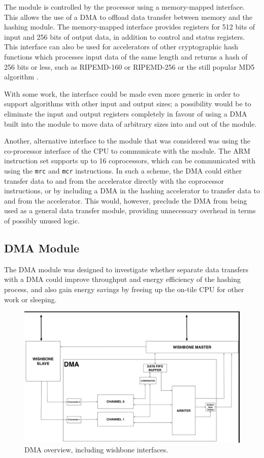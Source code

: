 The module is controlled by the processor using a memory-mapped interface. This allows the use
of a DMA to offload data transfer between memory and the hashing module. The memory-mapped interface
provides registers for 512 bits of input and 256 bits of output data, in addition to control and
status registers. This interface can also be used for accelerators of other cryptographic hash
functions which processes input data of the same length and returns a hash of 256 bits or less,
such as RIPEMD-160 or RIPEMD-256 \cite{ripemd} or the still popular MD5 algorithm \cite{md5}.

With some work, the interface could be made even more generic in order to support algorithms
with other input and output sizes; a possibility would be to eliminate the input and output
registers completely in favour of using a DMA built into the module to move data of arbitrary
sizes into and out of the module.

Another, alternative interface to the module that was considered was using the co-processor interface
of the CPU to communicate with the module. The ARM instruction set supports up to 16 coprocessors,
which can be communicated with using the \texttt{mrc} and \texttt{mcr} instructions. In such a scheme,
the DMA could either transfer data to and from the accelerator directly with the coprocessor instructions,
or by including a DMA in the hashing accelerator to transfer data to and from the accelerator. This would,
however, preclude the DMA from being used as a general data transfer module, providing unnecessary
overhead in terms of possibly unused logic.

\subsection{DMA Module}

The DMA module was designed to investigate whether separate data transfers with a DMA could improve throughput and energy efficiency of the hashing process, and also gain energy savings by freeing up the on-tile CPU for other work or sleeping.

\begin{figure}[htb]
    \centering
    \includegraphics[width=1.0\textwidth]{Figures/DMA/DMATopview}
    \caption{DMA overview, including wishbone interfaces.}
    \label{fig:DMATop}
\end{figure}

